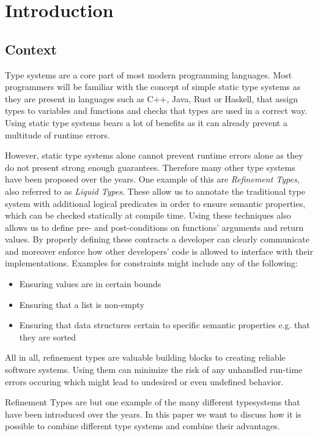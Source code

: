 \section{Introduction}
\label{sec:introduction}
\subsection{Context}
\label{ssec:context}
Type systems are a core part of most modern programming languages. Most programmers will be familiar with the concept of simple static type systems as they are present in languages such as C++, Java, Rust or Haskell, that assign types to variables and functions and checks that types are used in a correct way. Using static type systems bears a lot of benefits as it can already prevent a multitude of runtime errors.

However, static type systems alone cannot prevent runtime errors alone as they do not present strong enough guarantees. Therefore many other type systems have been proposed over the years. One example of this are \textit{Refinement Types}, also referred to as \textit{Liquid Types}. These allow us to annotate the traditional type system with additional logical predicates in order to ensure semantic properties, which can be checked statically at compile time. Using these techniques also allows us to define pre- and post-conditions on functions' arguments and return values. By properly defining these contracts a developer can clearly communicate and moreover enforce how other developers' code is allowed to interface with their implementations. Examples for constraints might include any of the following:

\begin{itemize}
	\item Ensuring values are in certain bounds
	\item Ensuring that a list is non-empty
	\item Ensuring that data structures certain to specific semantic properties e.g. that they are sorted
\end{itemize}

All in all, refinement types are valuable building blocks to creating reliable software systems. Using them can minimize the risk of any unhandled run-time errors occuring which might lead to undesired or even undefined behavior.

Refinement Types are but one example of the many different typesystems that have been introduced over the years. In this paper we want to discuss how it is possible to combine different type systems and combine their advantages.

